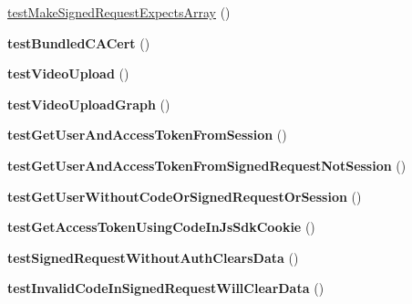 \begin{DoxyCompactItemize}
\item 
\hyperlink{classPHPSDKTestCase_aebd77583c00c95d9e7adb3bb191798f5}{test\-Make\-Signed\-Request\-Expects\-Array} ()
\item 
\hypertarget{classPHPSDKTestCase_ad0cb93bf32ed1876921ad970ad5eab3d}{{\bfseries test\-Bundled\-C\-A\-Cert} ()}\label{classPHPSDKTestCase_ad0cb93bf32ed1876921ad970ad5eab3d}

\item 
\hypertarget{classPHPSDKTestCase_a705a487b17675e54961b3d3f2971620d}{{\bfseries test\-Video\-Upload} ()}\label{classPHPSDKTestCase_a705a487b17675e54961b3d3f2971620d}

\item 
\hypertarget{classPHPSDKTestCase_aaa9348e23fe75e9c194f1ac5e00daeee}{{\bfseries test\-Video\-Upload\-Graph} ()}\label{classPHPSDKTestCase_aaa9348e23fe75e9c194f1ac5e00daeee}

\item 
\hypertarget{classPHPSDKTestCase_a90975cc76342348c8f5a1533387dfc69}{{\bfseries test\-Get\-User\-And\-Access\-Token\-From\-Session} ()}\label{classPHPSDKTestCase_a90975cc76342348c8f5a1533387dfc69}

\item 
\hypertarget{classPHPSDKTestCase_a328f26b2144da7b04a061b90be8d7389}{{\bfseries test\-Get\-User\-And\-Access\-Token\-From\-Signed\-Request\-Not\-Session} ()}\label{classPHPSDKTestCase_a328f26b2144da7b04a061b90be8d7389}

\item 
\hypertarget{classPHPSDKTestCase_a5ae70b92bf4c16a49d2a9a21f66d9b83}{{\bfseries test\-Get\-User\-Without\-Code\-Or\-Signed\-Request\-Or\-Session} ()}\label{classPHPSDKTestCase_a5ae70b92bf4c16a49d2a9a21f66d9b83}

\item 
\hypertarget{classPHPSDKTestCase_aae497b03dde955da1f478346fe2d91bb}{{\bfseries test\-Get\-Access\-Token\-Using\-Code\-In\-Js\-Sdk\-Cookie} ()}\label{classPHPSDKTestCase_aae497b03dde955da1f478346fe2d91bb}

\item 
\hypertarget{classPHPSDKTestCase_ab99897d94c9870e3012c972baccb95d8}{{\bfseries test\-Signed\-Request\-Without\-Auth\-Clears\-Data} ()}\label{classPHPSDKTestCase_ab99897d94c9870e3012c972baccb95d8}

\item 
\hypertarget{classPHPSDKTestCase_afadfcabeb2b2931c399f031baa8e3a6b}{{\bfseries test\-Invalid\-Code\-In\-Signed\-Request\-Will\-Clear\-Data} ()}\label{classPHPSDKTestCase_afadfcabeb2b2931c399f031baa8e3a6b}


\end{DoxyCompactItemize}
